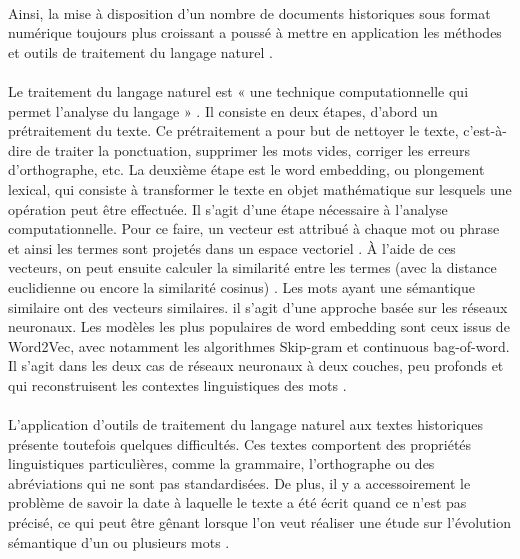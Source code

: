 \documentclass{article}
\begin{document}
\paragraph{}
Ainsi, la mise à disposition d’un nombre de documents historiques sous format numérique toujours plus croissant a poussé à mettre en application les méthodes et outils de traitement du langage naturel \cite{liebeskind2020deep}. 
\paragraph{}
Le traitement du langage naturel est « une technique computationnelle qui permet l’analyse du langage » \cite{di2021latin}. Il consiste en deux étapes, d’abord un prétraitement du texte. Ce prétraitement a pour but de nettoyer le texte, c’est-à-dire de traiter la ponctuation, supprimer les mots vides, corriger les erreurs d’orthographe, etc. La deuxième étape est le word embedding, ou plongement lexical, qui consiste à transformer le texte en objet mathématique sur lesquels une opération peut être effectuée. Il s’agit d’une étape nécessaire à l’analyse computationnelle. Pour ce faire, un vecteur est attribué à chaque mot ou phrase et ainsi les termes sont projetés dans un espace vectoriel \cite{di2021latin}. À l’aide de ces vecteurs, on peut ensuite calculer la similarité entre les termes (avec la distance euclidienne ou encore la similarité cosinus) \cite{di2021latin}. Les mots ayant une sémantique similaire ont des vecteurs similaires. il s’agit d’une approche basée sur les réseaux neuronaux. Les modèles les plus populaires de word embedding sont ceux issus de Word2Vec, avec notamment les algorithmes Skip-gram et continuous bag-of-word. Il s’agit dans les deux cas de réseaux neuronaux à deux couches, peu profonds et qui reconstruisent les contextes linguistiques des mots \cite{liebeskind2020deep}. 
\paragraph{}
L’application d’outils de traitement du langage naturel aux textes historiques présente toutefois quelques difficultés. Ces textes comportent des propriétés linguistiques particulières, comme la grammaire, l’orthographe ou des abréviations qui ne sont pas standardisées. De plus, il y a accessoirement le problème de savoir la date à laquelle le texte a été écrit quand ce n’est pas précisé, ce qui peut être gênant lorsque l’on veut réaliser une étude sur l’évolution sémantique d’un ou plusieurs mots \cite{liebeskind2020deep}. 
\end{document}
